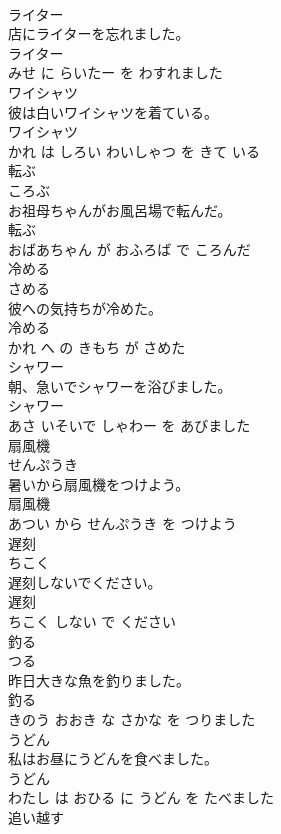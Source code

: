 \documentclass[8pt]{extreport}
\begin{document}
\begin{CJK}{UTF8}{min}
\\	ライター	
\\	店にライターを忘れました。	
\\	ライター 
\\	みせ に らいたー を わすれました			
\\	ワイシャツ	
\\	彼は白いワイシャツを着ている。	
\\	ワイシャツ 
\\	かれ は しろい わいしゃつ を きて いる			
\\	転ぶ	
\\	ころぶ			
\\	お祖母ちゃんがお風呂場で転んだ。	
\\	転ぶ 
\\	おばあちゃん が おふろば で ころんだ			
\\	冷める	
\\	さめる			
\\	彼への気持ちが冷めた。	
\\	冷める 
\\	かれ へ の きもち が さめた			
\\	シャワー	
\\	朝、急いでシャワーを浴びました。	
\\	シャワー 
\\	あさ いそいで しゃわー を あびました			
\\	扇風機	
\\	せんぷうき			
\\	暑いから扇風機をつけよう。	
\\	扇風機 
\\	あつい から せんぷうき を つけよう			
\\	遅刻	
\\	ちこく			
\\	遅刻しないでください。	
\\	遅刻 
\\	ちこく しない で ください			
\\	釣る	
\\	つる			
\\	昨日大きな魚を釣りました。	
\\	釣る 
\\	きのう おおき な さかな を つりました			
\\	うどん	
\\	私はお昼にうどんを食べました。	
\\	うどん 
\\	わたし は おひる に うどん を たべました			
\\	追い越す	

\end{CJK}
\end{document}
